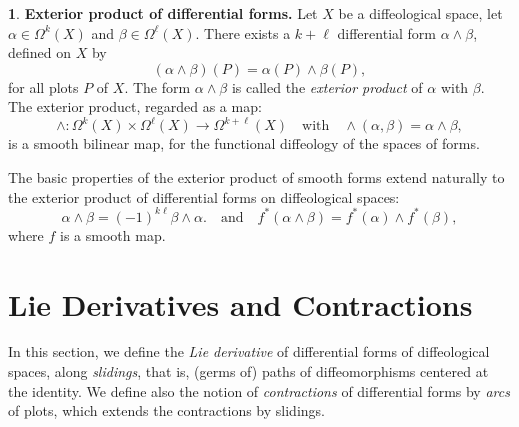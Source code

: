 \documentclass[11pt,reqno]{amsart}
\theoremstyle{definition}
\newtheorem{article}{}
\newcommand{\artlabel}[1]{{\bf #1.}}
\newcommand{\qmbox}[1]{\quad \mbox{#1}\quad}
\def \P{{P}}
\def \X{{X}}
\begin{document}
  \begin{article}\artlabel{Exterior product of differential forms}
    \label{Exterior-product-of-differential-forms}
    Let $\X$ be a diffeological space,
    let $\alpha \in \Omega^k(\X)$ and $\beta \in
      \Omega^\ell(\X)$. There exists a $k + \ell$
    differential form $\alpha \wedge \beta$, defined on
    $\X$ by
    $$
      (\alpha \wedge \beta)(\P) =\alpha(\P) \wedge \beta(\P),
      $$
    for all plots $\P$ of $\X$. The form $\alpha \wedge \beta$ is called the {\em
    exterior product} of $\alpha$ with $\beta$.
    The exterior product, regarded as a map: 
    $$
      \wedge: \Omega^k(\X) \times \Omega^\ell(\X) \to
      \Omega^{k+\ell}(\X) \qmbox{with}
      \wedge(\alpha,\beta) = \alpha\wedge \beta, 
      $$ 
    is a smooth bilinear map, for the functional diffeology
    of the spaces of forms.
    
    The basic properties of the exterior
    product of smooth forms extend naturally to the exterior
    product of differential forms on diffeological spaces: 
    $$
      \alpha\wedge \beta = (-1)^{k\ell} \beta\wedge\alpha.
      \qmbox{and} f^*(\alpha\wedge \beta) = f^*(\alpha)\wedge
      f^*(\beta),
      $$
    where $f$ is a smooth map.
  \end{article} %
  
  
  \section{Lie Derivatives and Contractions}
  \label{Section-Lie-Derivative- and-Contractions}
  
  \begin{text}
    In this section, we define the {\em Lie
    derivative} of differential forms of diffeological
    spaces, along {\em slidings}, that is, (germs of) paths of
    diffeomorphisms centered at the identity. We define
    also the notion of {\em contractions\/} of differential
    forms by {\em arcs\/} of  plots, which extends the
    contractions by slidings.
  \end{text}
  
\end{document}
